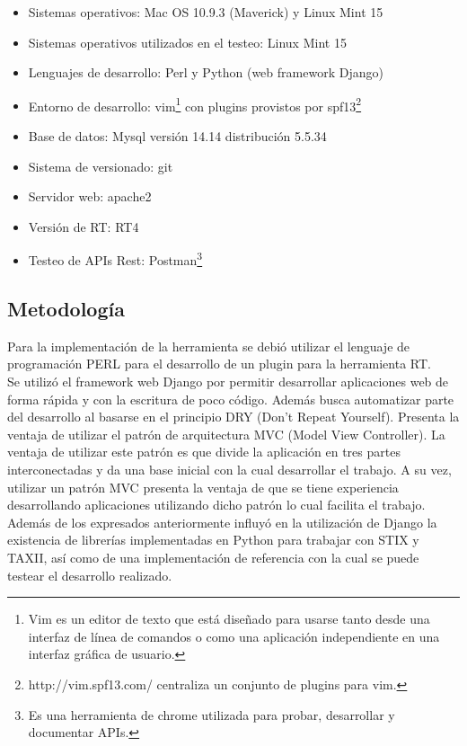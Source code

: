 \documentclass[11pt]{article}
\begin{document}
\begin{itemize}
	\item Sistemas operativos: Mac OS 10.9.3 (Maverick) y Linux Mint 15
	\item Sistemas operativos utilizados en el testeo: Linux Mint 15
	\item Lenguajes de desarrollo: Perl y Python (web framework Django)
	\item Entorno de desarrollo: vim\footnote{Vim es un editor de texto que está diseñado para usarse tanto desde una interfaz de línea de comandos o como una aplicación independiente en una interfaz gráfica de usuario.}  con plugins provistos por spf13\footnote{http://vim.spf13.com/ centraliza un conjunto de plugins para vim.}
	\item Base de datos: Mysql versión 14.14 distribución 5.5.34
	\item Sistema de versionado: git
	\item Servidor web: apache2
	\item Versión de RT: RT4
	\item Testeo de APIs Rest: Postman\footnote{Es una herramienta de chrome utilizada para probar, desarrollar y documentar APIs.}

\end{itemize}

\subsection{Metodología}
Para la implementación de la herramienta se debió utilizar el lenguaje de programación PERL para el desarrollo de un plugin para la herramienta RT.\\

Se utilizó el framework web Django por permitir desarrollar aplicaciones web de forma rápida y con la escritura de poco código. Además busca automatizar parte del desarrollo al basarse en el principio DRY (Don’t Repeat Yourself). Presenta la ventaja de utilizar el patrón de arquitectura MVC (Model View Controller). La ventaja de utilizar este patrón es que divide la aplicación en tres partes interconectadas y da una base inicial con la cual desarrollar el trabajo. A su vez, utilizar un patrón MVC presenta la ventaja de que se tiene experiencia desarrollando aplicaciones utilizando dicho patrón lo cual facilita el trabajo.
Además de los expresados anteriormente influyó en la utilización de Django la existencia de librerías implementadas en Python para trabajar con STIX y TAXII, así como de una implementación de referencia con la cual se puede testear el desarrollo realizado.\\
\end{document}
